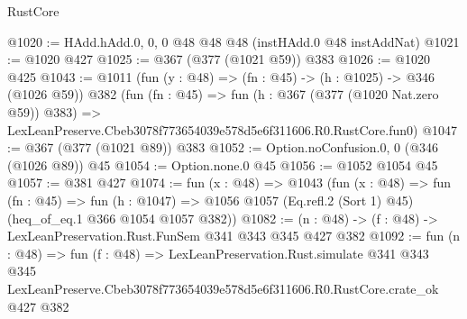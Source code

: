 \begin{lexlean}{RustCore}
\begin{coremodule}
@1020 := HAdd.hAdd.{0, 0, 0} @48 @48 @48 (instHAdd.{0} @48 instAddNat)
@1021 := @1020 @427
@1025 := @367 (@377 (@1021 @59)) @383
@1026 := @1020 @425
@1043 := @1011
    (fun (y : @48) => (fn : @45) -> (h : @1025) -> @346 (@1026 @59))
    @382
    (fun (fn : @45) =>
    fun (h : @367 (@377 (@1020 Nat.zero @59)) @383) =>
    LexLeanPreserve.Cbeb3078f773654039e578d5e6f311606.R0.RustCore.fun0)
@1047 := @367 (@377 (@1021 @89)) @383
@1052 := Option.noConfusion.{0, 0} (@346 (@1026 @89)) @45
@1054 := Option.none.{0} @45
@1056 := @1052 @1054 @45
@1057 := @381 @427
@1074 := fun (x : @48) =>
  @1043
    (fun (x : @48) =>
    fun (fn : @45) =>
    fun (h : @1047) => @1056 @1057 (Eq.refl.{2} (Sort 1) @45) (heq_of_eq.{1} @366 @1054 @1057 @382))
@1082 := (n : @48) -> (f : @48) -> LexLeanPreservation.Rust.FunSem @341 @343 @345 @427 @382
@1092 := fun (n : @48) =>
  fun (f : @48) =>
  LexLeanPreservation.Rust.simulate
    @341
    @343
    @345
    LexLeanPreserve.Cbeb3078f773654039e578d5e6f311606.R0.RustCore.crate_ok
    @427
    @382
\end{coremodule}
\end{lexlean}
